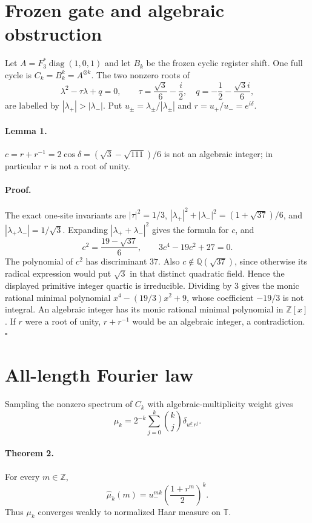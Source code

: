 \documentclass[10pt]{article}
\begin{document}
\section{Frozen gate and algebraic obstruction}
Let $A=F_3^*\operatorname{diag}(1,0,1)$ and let $B_k$ be the frozen cyclic
register shift.  One full cycle is $C_k=B_k^k=A^{\otimes k}$.  The two
nonzero roots of
\[
 \lambda^2-\tau\lambda+q=0,\qquad
 \tau=\frac{\sqrt3}{6}-\frac i2,\quad
 q=-\frac12-\frac{\sqrt3 i}{6},
\]
are labelled by $|\lambda_+|>|\lambda_-|$.  Put
$u_\pm=\lambda_\pm/|\lambda_\pm|$ and $r=u_+/u_-=e^{i\delta}$.

\paragraph{Lemma 1.}
$c=r+r^{-1}=2\cos\delta=(\sqrt3-\sqrt{111})/6$ is not an algebraic integer;
in particular $r$ is not a root of unity.

\paragraph{Proof.}
The exact one-site invariants are
$|\tau|^2=1/3$,
$|\lambda_+|^2+|\lambda_-|^2=(1+\sqrt{37})/6$, and
$|\lambda_+\lambda_-|=1/\sqrt3$.  Expanding
$|\lambda_++\lambda_-|^2$ gives the formula for $c$, and
\[
 c^2=\frac{19-\sqrt{37}}6,\qquad 3c^4-19c^2+27=0.
\]
The polynomial of $c^2$ has discriminant $37$.  Also
$c\notin\mathbb Q(\sqrt{37})$, since otherwise its radical expression would
put $\sqrt3$ in that distinct quadratic field.  Hence the displayed
primitive integer quartic is irreducible.  Dividing by $3$ gives the monic
rational minimal polynomial $x^4-(19/3)x^2+9$, whose coefficient $-19/3$ is
not integral.  An algebraic integer has its monic rational minimal polynomial
in $\mathbb Z[x]$.  If $r$ were a root of unity, $r+r^{-1}$ would be an
algebraic integer, a contradiction. \hfill$\square$

\section{All-length Fourier law}
Sampling the nonzero spectrum of $C_k$ with algebraic-multiplicity weight
gives
\[
 \mu_k=2^{-k}\sum_{j=0}^k{\binom kj}\delta_{u_-^k r^j}.
\]
\paragraph{Theorem 2.}
For every $m\in\mathbb Z$,
\[
 \widehat\mu_k(m)=u_-^{mk}\left(\frac{1+r^m}{2}\right)^k.       \tag{1}
\]
Thus $\mu_k$ converges weakly to normalized Haar measure on $\mathbb T$.
\end{document}
